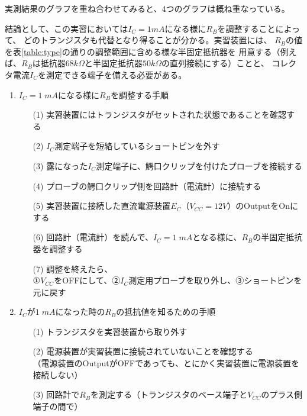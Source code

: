 \documentclass[uplatex,a4paper,11pt,oneside,openany]{jsbook}
\begin{document}
実測結果のグラフを重ね合わせてみると、4つのグラフは概ね重なっている。

結論として、この実習においては$I_C=1mA$になる様に$R_B$を調整することによって、
どのトランジスタも代替となり得ることが分かる。実習装置には、
$R_B$の値を表\ref{table:type}の通りの調整範囲に含める様な半固定抵抗器を
用意する（例えば、$R_B$は抵抗器$68k\Omega$と半固定抵抗器$50k\Omega$の直列接続にする）ことと、
コレクタ電流$I_C$を測定できる端子を備える必要がある。

\vfill

\begin{enumerate}
\item $I_C=1\;mA$になる様に$R_B$を調整する手順
\begin{enumerate}
\item[(1)] 実習装置にはトランジスタがセットされた状態であることを確認する
\item[(2)] $I_C$測定端子を短絡しているショートピンを外す
\item[(3)] 露になった$I_C$測定端子に、鰐口クリップを付けたプローブを接続する
\item[(4)] プローブの鰐口クリップ側を回路計（電流計）に接続する
\item[(5)] 実習装置に接続した直流電源装置$E_C（V_{CC}=12V）$のOutputをOnにする
\item[(6)] 回路計（電流計）を読んで、$I_C=1\;mA$となる様に、$R_B$の半固定抵抗器を調整する
\item[(7)] 調整を終えたら、\\①$V_{CC}$をOFFにして、②$I_C$測定用プローブを取り外し、③ショートピンを元に戻す
\end{enumerate}

\vfill

\item $I_C$が$1\;mA$になった時の$R_B$の抵抗値を知るための手順
\begin{enumerate}
\item[(1)] トランジスタを実習装置から取り外す
\item[(2)] 電源装置が実習装置に接続されていないことを確認する\\
（電源装置のOutputがOFFであっても、とにかく実習装置に電源装置を接続しない）
\item[(3)] 回路計で$R_B$を測定する（トランジスタのベース端子と$V_{CC}$のプラス側端子の間で）
\end{enumerate}
\end{enumerate}

\newpage
\end{document}
